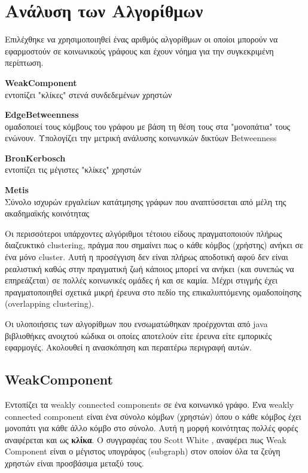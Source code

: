 \section{Ανάλυση των Αλγορίθμων}
\noindent
Επιλέχθηκε να χρησιμοποιηθεί ένας αριθμός αλγορίθμων οι οποίοι μπορούν να εφαρμοστούν σε κοινωνικούς γράφους και έχουν νόημα για την συγκεκριμένη περίπτωση.
\begin{description}
\item  \textbf{WeakComponent} \\ \hfill  %
εντοπίζει "κλίκες" στενά συνδεδεμένων χρηστών
\item  \textbf{EdgeBetweenness} \\ \hfill %
ομαδοποιεί τους κόμβους του γράφου με βάση τη θέση τους στα "μονοπάτια" τους ενώνουν. Υπολογίζει την μετρική ανάλυσης κοινωνικών δικτύων Betweenness
\item  \textbf{BronKerbosch} \\ \hfill  %
εντοπίζει τις μέγιστες "κλίκες" χρηστών
\item  \textbf{Metis} \\ \hfill  %
Σύνολο ισχυρών εργαλείων κατάτμησης γράφων που αναπτύσσεται από μέλη της ακαδημαϊκής κοινότητας
\end{description} 

Οι περισσότεροι υπάρχοντες αλγόριθμοι τέτοιου είδους πραγματοποιούν πλήρως διαζευκτικό clustering, πράγμα που σημαίνει 
πως ο κάθε κόμβος (χρήστης) ανήκει σε ένα μόνο cluster. Αυτή η προσέγγιση δεν είναι πλήρως αποδοτική αφού δεν είναι ρεαλιστική καθώς στην πραγματική ζωή 
κάποιος μπορεί να ανήκει (και συνεπώς να επηρεάζεται) σε πολλές κοινωνικές ομάδες ή και σε καμία. 
Μέχρι στιγμής έχει πραγματοποιηθεί σχετικά μικρή έρευνα στο πεδίο της επικαλυπτόμενης ομαδοποίησης (overlapping clustering). \cite{kabiljosocial}

Οι υλοποιήσεις των αλγορίθμων που ενσωματώθηκαν προέρχονται από java βιβλιοθήκες ανοιχτού κώδικα οι οποίες αποτελούν είτε έρευνα είτε εμπορικές εφαρμογές.
Ακολουθεί η ανασκόπηση και περαιτέρω περιγραφή αυτών.

\subsection{WeakComponent}
\label{WeakComponent}
\noindent
Εντοπίζει τα weakly connected components σε ένα κοινωνικό γράφο.
Ένα weakly connected component είναι ένα σύνολο κόμβων (χρηστών) όπου ο κάθε κόμβος έχει μονοπάτι για κάθε άλλο κόμβο στο σύνολο.
Αυτή η μορφή κοινότητας πολλές φορές αναφέρεται και ως \textbf{κλίκα}.
Ο συγγραφέας του Scott White \cite{WeakComponent}, αναφέρει πως Weak Component είναι ο μέγιστος υπογράφος (subgraph) στον οποίον όλα τα ζεύγη χρηστών είναι προσβάσιμα μεταξύ τους.

